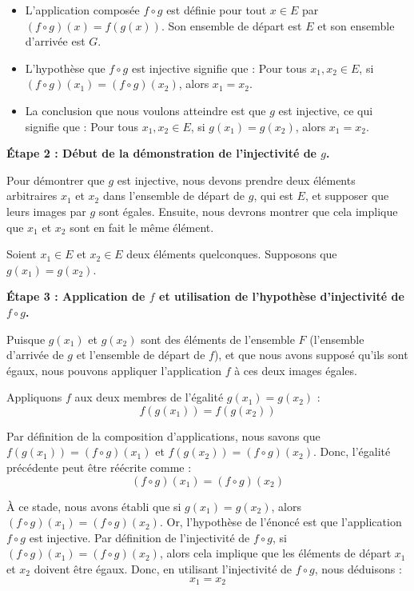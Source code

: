 \documentclass[12pt,a4paper]{report}
\providecommand{\tightlist}{%
  \setlength{\itemsep}{0pt}\setlength{\parskip}{0pt}}
\begin{document}
\begin{itemize}
\tightlist
\item
  L'application composée \(f \circ g\) est définie pour tout \(x \in E\)
  par \((f \circ g)(x) = f(g(x))\). Son ensemble de départ est \(E\) et
  son ensemble d'arrivée est \(G\).
\item
  L'hypothèse que \(f \circ g\) est injective signifie que : Pour tous
  \(x_1, x_2 \in E\), si \((f \circ g)(x_1) = (f \circ g)(x_2)\), alors
  \(x_1 = x_2\).
\item
  La conclusion que nous voulons atteindre est que \(g\) est injective,
  ce qui signifie que : Pour tous \(x_1, x_2 \in E\), si
  \(g(x_1) = g(x_2)\), alors \(x_1 = x_2\).
\end{itemize}

\textbf{Étape 2 : Début de la démonstration de l'injectivité de \(g\).}

Pour démontrer que \(g\) est injective, nous devons prendre deux
éléments arbitraires \(x_1\) et \(x_2\) dans l'ensemble de départ de
\(g\), qui est \(E\), et supposer que leurs images par \(g\) sont
égales. Ensuite, nous devrons montrer que cela implique que \(x_1\) et
\(x_2\) sont en fait le même élément.

Soient \(x_1 \in E\) et \(x_2 \in E\) deux éléments quelconques.
Supposons que \(g(x_1) = g(x_2)\).

\textbf{Étape 3 : Application de \(f\) et utilisation de l'hypothèse
d'injectivité de \(f \circ g\).}

Puisque \(g(x_1)\) et \(g(x_2)\) sont des éléments de l'ensemble \(F\)
(l'ensemble d'arrivée de \(g\) et l'ensemble de départ de \(f\)), et que
nous avons supposé qu'ils sont égaux, nous pouvons appliquer
l'application \(f\) à ces deux images égales.

Appliquons \(f\) aux deux membres de l'égalité \(g(x_1) = g(x_2)\) :
\[ f(g(x_1)) = f(g(x_2)) \]

Par définition de la composition d'applications, nous savons que
\(f(g(x_1)) = (f \circ g)(x_1)\) et \(f(g(x_2)) = (f \circ g)(x_2)\).
Donc, l'égalité précédente peut être réécrite comme :
\[ (f \circ g)(x_1) = (f \circ g)(x_2) \]

À ce stade, nous avons établi que si \(g(x_1) = g(x_2)\), alors
\((f \circ g)(x_1) = (f \circ g)(x_2)\). Or, l'hypothèse de l'énoncé est
que l'application \(f \circ g\) est injective. Par définition de
l'injectivité de \(f \circ g\), si
\((f \circ g)(x_1) = (f \circ g)(x_2)\), alors cela implique que les
éléments de départ \(x_1\) et \(x_2\) doivent être égaux. Donc, en
utilisant l'injectivité de \(f \circ g\), nous déduisons :
\[ x_1 = x_2 \]
\end{document}

